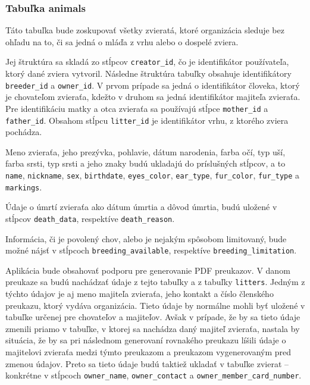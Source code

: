 \subsubsection*{Tabuľka animals}\label{tabulka-animals}
Táto tabuľka bude zoskupovať všetky zvieratá, ktoré organizácia sleduje bez ohľadu na to, či sa jedná o mláďa z vrhu alebo o dospelé zviera. 

Jej štruktúra sa skladá zo stĺpcov \texttt{creator_id}, čo je identifikátor používateľa, ktorý dané zviera vytvoril. Následne štruktúra tabuľky obsahuje identifikátory \texttt{breeder_id} a \texttt{owner_id}. V prvom prípade sa jedná o identifikátor človeka, ktorý je chovateľom zvieraťa, kdežto v druhom sa jedná identifikátor majiteľa zvieraťa. Pre identifikáciu matky a otca zvieraťa sa používajú stĺpce \texttt{mother_id} a \texttt{father_id}. Obsahom stĺpcu \texttt{litter_id} je identifikátor vrhu, z ktorého zviera pochádza.

Meno zvieraťa, jeho prezývka, pohlavie, dátum narodenia, farba očí, typ uší, farba srsti, typ srsti a jeho znaky budú ukladajú do príslušných stĺpcov, a to  \texttt{name}, \texttt{nickname}, \texttt{sex}, \texttt{birthdate}, \texttt{eyes_color}, \texttt{ear_type}, \texttt{fur_color}, \texttt{fur_type} a \texttt{markings}.

Údaje o úmrtí zvieraťa ako dátum úmrtia a dôvod úmrtia, budú uložené v stĺpcov \texttt{death_data}, respektíve \texttt{death_reason}.

Informácia, či je povolený chov, alebo je nejakým spôsobom limitovaný, bude možné nájsť v stĺpcoch \texttt{breeding_available}, respektíve \texttt{breeding_limitation}.

Aplikácia bude obsahovať podporu pre generovanie PDF preukazov. V danom preukaze sa budú nachádzať údaje z tejto tabuľky a z tabuľky \texttt{litters}. Jedným z týchto údajov je aj meno majiteľa zvieraťa, jeho kontakt a číslo členského preukazu, ktorý vydáva organizácia. Tieto údaje by normálne mohli byť uložené v tabuľke určenej pre chovateľov a majiteľov. Avšak v prípade, že by sa tieto údaje zmenili priamo v tabuľke, v ktorej sa nachádza daný majiteľ zvieraťa, nastala by situácia, že by sa pri následnom generovaní rovnakého preukazu líšili údaje o majitelovi zvieraťa medzi týmto preukazom a preukazom vygenerovaným pred zmenou údajov.
Preto sa tieto údaje budú taktiež ukladať v tabuľke zvierat -- konkrétne v stĺpcoch \texttt{owner_name}, \texttt{owner_contact} a \texttt{owner_member_card_number}.

